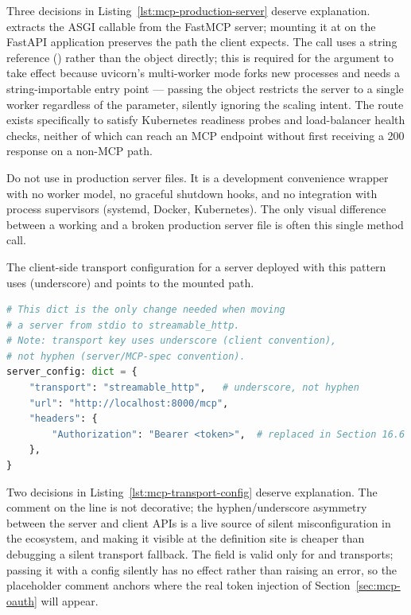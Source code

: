 Three decisions in Listing~\ref{lst:mcp-production-server} deserve
explanation.  extracts the ASGI callable
from the FastMCP server; mounting it at  on the FastAPI
application preserves the  path the client expects.
The  call uses a string reference
() rather than the object directly;
this is required for the  argument to take effect
because uvicorn's multi-worker mode forks new processes and needs a
string-importable entry point --- passing the object restricts the
server to a single worker regardless of the  parameter,
silently ignoring the scaling intent. The  route exists
specifically to satisfy Kubernetes readiness probes and load-balancer
health checks, neither of which can reach an MCP endpoint without first
receiving a 200 response on a non-MCP path.

\begin{warningbox}
Do not use  in production server files.
It is a development convenience wrapper with no worker model, no
graceful shutdown hooks, and no integration with process supervisors
(systemd, Docker, Kubernetes). The only visual difference between
a working and a broken production server file is often this single
method call.
\end{warningbox}

The client-side transport configuration for a server deployed with this
pattern uses  (underscore) and points to the
mounted path.

\begin{lstlisting}[language=Python,
                   caption={Client transport configuration for a production server},
                   label={lst:mcp-transport-config}]
# This dict is the only change needed when moving
# a server from stdio to streamable_http.
# Note: transport key uses underscore (client convention),
# not hyphen (server/MCP-spec convention).
server_config: dict = {
    "transport": "streamable_http",   # underscore, not hyphen
    "url": "http://localhost:8000/mcp",
    "headers": {
        "Authorization": "Bearer <token>",  # replaced in Section 16.6
    },
}
\end{lstlisting}

Two decisions in Listing~\ref{lst:mcp-transport-config} deserve
explanation. The comment on the  line is not decorative;
the hyphen/underscore asymmetry between the server and client APIs
is a live source of silent misconfiguration in the ecosystem, and
making it visible at the definition site is cheaper than debugging a
silent transport fallback. The  field is valid only for
 and  transports; passing it with a
 config silently has no effect rather than raising an error,
so the placeholder comment anchors where the real token injection of
Section~\ref{sec:mcp-oauth} will appear.

